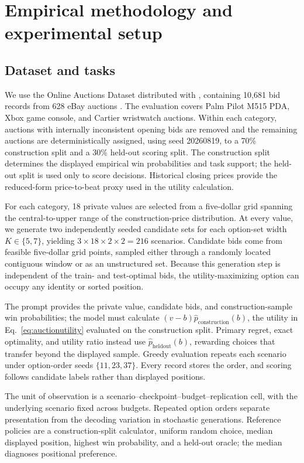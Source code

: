 \documentclass{article}
\begin{document}
\section{Empirical methodology and experimental setup}

\subsection{Dataset and tasks}

We use the Online Auctions Dataset distributed with \citet{jank2010modeling}, containing 10,681 bid records from 628 eBay auctions \citep{onlineauctionsdataset}. The evaluation covers Palm Pilot M515 PDA, Xbox game console, and Cartier wristwatch auctions. Within each category, auctions with internally inconsistent opening bids are removed and the remaining auctions are deterministically assigned, using seed 20260819, to a 70\% construction split and a 30\% held-out scoring split. The construction split determines the displayed empirical win probabilities and task support; the held-out split is used only to score decisions. Historical closing prices provide the reduced-form price-to-beat proxy used in the utility calculation.

For each category, 18 private values are selected from a five-dollar grid spanning the central-to-upper range of the construction-price distribution. At every value, we generate two independently seeded candidate sets for each option-set width $K\in\{5,7\}$, yielding $3\times18\times2\times2=216$ scenarios. Candidate bids come from feasible five-dollar grid points, sampled either through a randomly located contiguous window or as an unstructured set. Because this generation step is independent of the train- and test-optimal bids, the utility-maximizing option can occupy any identity or sorted position.

The prompt provides the private value, candidate bids, and construction-sample win probabilities; the model must calculate $(v-b)\widehat p_{\mathrm{construction}}(b)$, the utility in Eq.~\eqref{eq:auctionutility} evaluated on the construction split. Primary regret, exact optimality, and utility ratio instead use $\widehat p_{\mathrm{heldout}}(b)$, rewarding choices that transfer beyond the displayed sample. Greedy evaluation repeats each scenario under option-order seeds $\{11,23,37\}$. Every record stores the order, and scoring follows candidate labels rather than displayed positions.

The unit of observation is a scenario--checkpoint--budget--replication cell, with the underlying scenario fixed across budgets. Repeated option orders separate presentation from the decoding variation in stochastic generations. Reference policies are a construction-split calculator, uniform random choice, median displayed position, highest win probability, and a held-out oracle; the median diagnoses positional preference.
\end{document}

